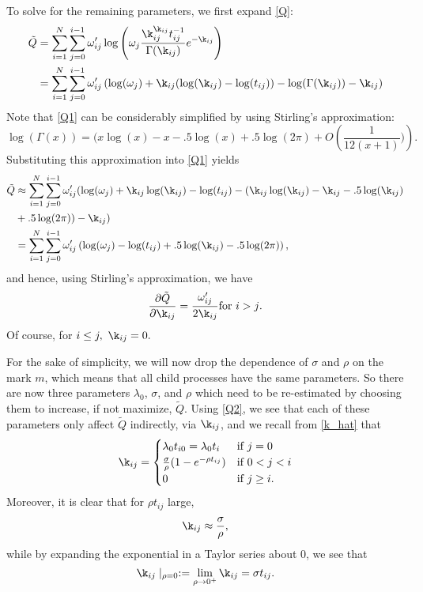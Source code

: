 \documentclass[12pt,leqno]{article}
\begin{document}
To solve for the remaining parameters, we first expand \eqref{Q}:
\begin{equation}\label{Q1}
  \begin{split}
    \tilde{Q} &= \sum_{i=1}^N\sum_{j=0}^{i-1}\omega'_{ij}\log\left(\omega_j\frac{\k_{ij}^{\k_{ij}}t_{ij}^{-1}}
          {\Gamma(\k_{ij})}e^{-\k_{ij}} \right)\\
    &= \sum_{i=1}^N\sum_{j=0}^{i-1}\omega'_{ij}\left(\log(\omega_j)+\k_{ij}(\log(\k_{ij}) - \log(t_{ij})) 
          -\log(\Gamma(\k_{ij})) -\k_{ij}\right)\\
  \end{split}
\end{equation}
Note that \eqref{Q1} can be considerably simplified by using Stirling's approximation:
\begin{equation}\label{stirling}
  \log(\Gamma(x)) =  (x\log(x) -x - .5\log(x) + .5\log(2\pi) + O\left(\frac{1}{12(x+1)})\right).%
\end{equation}
Substituting this approximation into \eqref{Q1} yields
\begin{equation}\label{Q2}
  \begin{split}
    \tilde{Q} &\approx \sum_{i=1}^N\sum_{j=0}^{i-1}\omega'_{ij}(\log(\omega_j)+\k_{ij}\log(\k_{ij}) - \log(t_{ij})
    -(\k_{ij}\log(\k_{ij}) -\k_{ij} -.5\log(\k_{ij}) \\
    &+ .5\log(2\pi)) -\k_{ij})\\
  &= \sum_{i=1}^N\sum_{j=0}^{i-1}\omega'_{ij}\left(\log(\omega_j) - \log(t_{ij}) + .5\log(\k_{ij})
  - .5\log(2\pi) \right),
  \end{split}
\end{equation}
and hence, using Stirling's approximation, we have 
\begin{equation}\label{dQ_dk}
  \frac{\partial\tilde{Q}}{\partial\k_{ij}} = \frac{\omega'_{ij}}{2\k_{ij}}\text{for $i > j$.}
\end{equation}
Of course, for $i \le j,~\k_{ij} = 0.$

For the sake of simplicity, we will now drop the dependence of $\sigma$ and $\rho$ on the mark $m$, which means
that all child processes have the same parameters.  So there are now three parameters $\lambda_0$, $\sigma$, and
$\rho$ which need to be re-estimated by choosing them to increase, if not maximize, $\tilde{Q}$.  
Using \eqref{Q2}, we see that each of these parameters only affect $\tilde{Q}$ indirectly, via $\k_{ij}$, and we recall
from \eqref{k_hat} that
$$
\k_{ij} = \begin{cases}
\lambda_0t_{i0} = \lambda_0t_i & \text{if $j = 0$}\\
\frac{\sigma}{\rho}(1-e^{-\rho{t_{ij}}}) & \text{if $0 < j < i$}\\
0 &\text{if $j\ge i$}.
\end{cases}
$$
Moreover, it is clear that for $\rho{t_{ij}}$ large,
$$
\k_{ij} \approx \frac{\sigma}{\rho},
$$
while by expanding the exponential in a Taylor series about 0, we see that
\begin{equation}\label{k_hat(0)}
\k_{ij}\mid_{\rho=0} := \lim_{\rho\rightarrow{0^+}}\k_{ij} = \sigma{t_{ij}}.
\end{equation}
\end{document}
